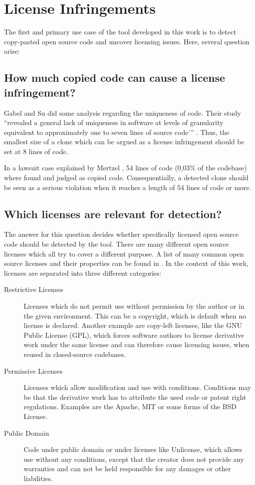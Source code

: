 \section{License Infringements}\label{section:preliminaries/infringement}
The first and primary use case of the tool developed in this work is to detect copy-pasted open source code and uncover licensing issues.
Here, several question arise:

\subsection*{How much copied code can cause a license infringement?}\label{section:preliminaries/infringement/how_much_code}
Gabel and Su did some analysis regarding the uniqueness of code.
Their study \enquote{revealed a general lack of uniqueness in software at levels of granularity equivalent to approximately one to seven lines of source code'} \cite{2010-gabel-su-source-code-uniqueness}.
Thus, the smallest size of a clone which can be argued as a license infringement should be set at 8 lines of code.

In a lawsuit case explained by Mertzel \cite{mertzel2008copying}, 54 lines of code (0,03\% of the codebase) where found and judged as copied code.
Consequentially, a detected clone should be seen as a serious violation when it reaches a length of 54 lines of code or more.

\subsection*{Which licenses are relevant for detection?}\label{section:preliminaries/infringement/relevant_licenses}
The answer for this question decides whether specifically licensed open source code should be detected by the tool.
There are many different open source licenses which all try to cover a different purpose.
A list of many common open source licenses and their properties can be found in \cite{licenses}.
In the context of this work, licenses are separated into three different categories:

\begin{description}
	\item[Restrictive Licenses] Licenses which do not permit use without permission by the author or in the given environment.
		This can be a copyright, which is default when no license is declared.
		Another example are copy-left licenses, like the GNU Public License (GPL), which forces software authors to license derivative work under the same license and can therefore cause licensing issues, when reused in closed-source codebases.
	\item[Permissive Licenses]
		Licenses which allow modification and use with conditions.
		Conditions may be that the derivative work has to attribute the used code or patent right regulations.
		Examples are the Apache, MIT or some forms of the BSD License.
	\item[Public Domain] 
		Code under public domain or under licenses like Unlicense, which allows use without any conditions, except that the creator does not provide any warranties and can not be held responsible for any damages or other liabilities.
\end{description}

